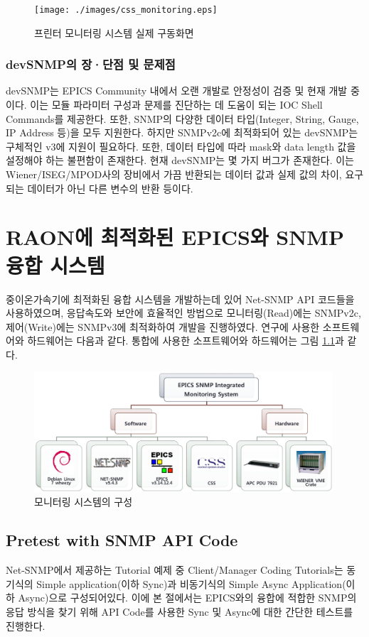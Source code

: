 \documentclass[11pt
  , a4paper
  , article
  , oneside
]{memoir}
\begin{document}
\begin{figure}[h!]
  \centering
  \texttt{[image: ./images/css\_monitoring.eps]}
  \caption{프린터 모니터링 시스템 실제 구동화면}
  \label{fig:css_monitoring}   
\end{figure}

\subsection{devSNMP의 장·단점 및 문제점}
devSNMP는 EPICS Community 내에서 오랜 개발로 안정성이 검증 및 현재 개발 중이다. 이는 모듈 파라미터 구성과 문제를 진단하는 데 도움이 되는 IOC Shell Commands를 제공한다. 또한, SNMP의 다양한 데이터 타입(Integer, String, Gauge, IP Address 등)을 모두 지원한다. 하지만 SNMPv2c에 최적화되어 있는 devSNMP는 구체적인 v3에 지원이 필요하다. 또한, 데이터 타입에 따라 mask와 data length 값을 설정해야 하는 불편함이 존재한다. 현재 devSNMP는 몇 가지 버그가 존재한다. 이는 Wiener/ISEG/MPOD사의 장비에서 가끔 반환되는 데이터 값과 실제 값의 차이, 요구되는 데이터가 아닌 다른 변수의 반환 등이다.

\chapter{RAON에 최적화된 EPICS와 SNMP 융합 시스템}
중이온가속기에 최적화된 융합 시스템을 개발하는데 있어  Net-SNMP API 코드들을 사용하였으며, 응답속도와 보안에 효율적인 방법으로 모니터링(Read)에는 SNMPv2c, 제어(Write)에는 SNMPv3에 최적화하여 개발을 진행하였다. 연구에 사용한 소프트웨어와 하드웨어는 다음과 같다. 통합에 사용한 소프트웨어와 하드웨어는 그림 \ref{fig:integ2}과 같다.

\begin{figure}[h!]
  \centering
  \includegraphics[width=0.99\textwidth]{./images/integ.eps}
  \caption{모니터링 시스템의 구성}
  \label{fig:integ2}   
\end{figure}


\section{Pretest with SNMP API Code}
Net-SNMP에서 제공하는 Tutorial 예제 중 Client/Manager Coding Tutorials는 동기식의 Simple application(이하 Sync)과 비동기식의 Simple Async Application(이하 Async)으로 구성되어있다. 이에 본 절에서는 EPICS와의 융합에 적합한 SNMP의 응답 방식을 찾기 위해 API Code를 사용한 Sync 및 Async에 대한 간단한 테스트를 진행한다. 
\end{document}
